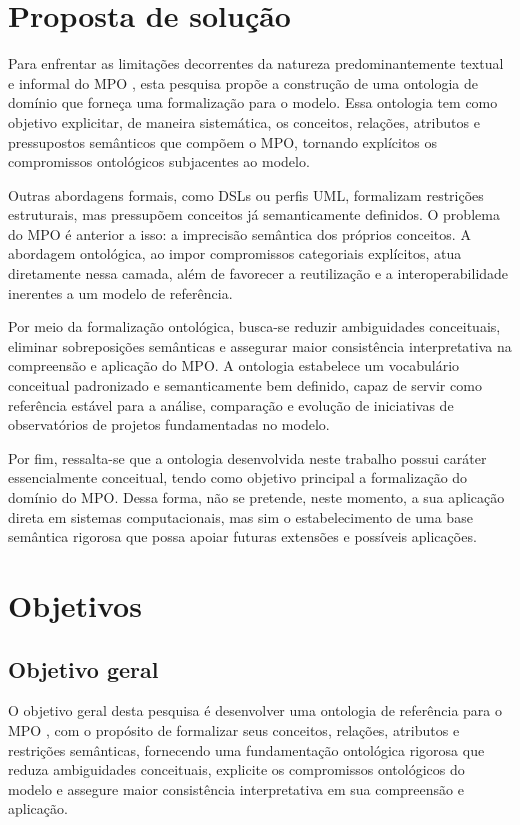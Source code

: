 \section{Proposta de solução}
Para enfrentar as limitações decorrentes da natureza predominantemente textual e informal do MPO \cite{vieira2022thesis}, esta pesquisa propõe a construção de uma ontologia de domínio que forneça uma formalização para o modelo. Essa ontologia tem como objetivo explicitar, de maneira sistemática, os conceitos, relações, atributos e pressupostos semânticos que compõem o MPO, tornando explícitos os compromissos ontológicos subjacentes ao modelo.

Outras abordagens formais, como DSLs ou perfis UML, formalizam restrições
estruturais, mas pressupõem conceitos já semanticamente definidos. O problema
do MPO é anterior a isso: a imprecisão semântica dos próprios conceitos.
A abordagem ontológica, ao impor compromissos categoriais explícitos, atua
diretamente nessa camada, além de favorecer a reutilização e a
interoperabilidade inerentes a um modelo de referência.

Por meio da formalização ontológica, busca-se reduzir ambiguidades conceituais, eliminar sobreposições semânticas e assegurar maior consistência interpretativa na compreensão e aplicação do MPO. A ontologia estabelece um vocabulário conceitual padronizado e semanticamente bem definido, capaz de servir como referência estável para a análise, comparação e evolução de iniciativas de observatórios de projetos fundamentadas no modelo.

Por fim, ressalta-se que a ontologia desenvolvida neste trabalho possui caráter essencialmente conceitual, tendo como objetivo principal a formalização do domínio do MPO. Dessa forma, não se pretende, neste momento, a sua aplicação direta em sistemas computacionais, mas sim o estabelecimento de uma base semântica rigorosa que possa apoiar futuras extensões e possíveis aplicações.

\section{Objetivos}
\subsection{Objetivo geral}
O objetivo geral desta pesquisa é desenvolver uma ontologia de referência para o MPO \cite{vieira2022thesis}, com o propósito de formalizar seus conceitos, relações, atributos e restrições semânticas, fornecendo uma fundamentação ontológica rigorosa que reduza ambiguidades conceituais, explicite os compromissos ontológicos do modelo e assegure maior consistência interpretativa em sua compreensão e aplicação.

